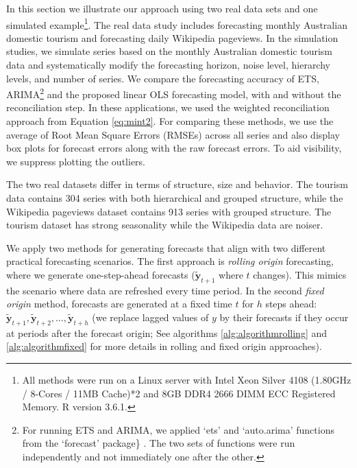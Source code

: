 \documentclass[11pt,a4paper,]{article}
\begin{document}
In this section we illustrate our approach using two real data sets and one simulated example\footnote{All methods were run on a Linux server with Intel Xeon Silver 4108 (1.80GHz / 8-Cores / 11MB Cache)*2 and 8GB DDR4 2666 DIMM ECC Registered Memory. R version 3.6.1.}. The real data study includes forecasting monthly Australian domestic tourism and forecasting daily Wikipedia pageviews. In the simulation studies, we simulate series based on the monthly Australian domestic tourism data and systematically modify the forecasting horizon, noise level, hierarchy levels, and number of series. We compare the forecasting accuracy of ETS, ARIMA\footnote{For running ETS and ARIMA, we applied `ets' and `auto.arima' functions from the `forecast' package\} \autocite{Rforecast}. The two sets of functions were run independently and not immediately one after the other.} and the proposed linear OLS forecasting model, with and without the reconciliation step. In these applications, we used the weighted reconciliation approach from Equation \eqref{eq:mint2}. For comparing these methods, we use the average of Root Mean Square Errors (RMSEs) across all series and also display box plots for forecast errors along with the raw forecast errors. To aid visibility, we suppress plotting the outliers.

The two real datasets differ in terms of structure, size and behavior. The tourism data contains 304 series with both hierarchical and grouped structure, while the Wikipedia pageviews dataset contains 913 series with grouped structure. The tourism dataset has strong seasonality while the Wikipedia data are noiser.

We apply two methods for generating forecasts that align with two different practical forecasting scenarios. The first approach is \emph{rolling origin} forecasting, where we generate one-step-ahead forecasts (\(\tilde{\bm{y}}_{t+1}\) where \(t\) changes). This mimics the scenario where data are refreshed every time period. In the second \emph{fixed origin} method, forecasts are generated at a fixed time \(t\) for \(h\) steps ahead: \(\tilde{\bm{y}}_{t+1}, \tilde{\bm{y}}_{t+2},\dots, \tilde{\bm{y}}_{t+h}\) (we replace lagged values of \(y\) by their forecasts if they occur at periods after the forecast origin; See algorithms \ref{alg:algorithmrolling} and \ref{alg:algorithmfixed} for more details in rolling and fixed origin approaches).
\end{document}
